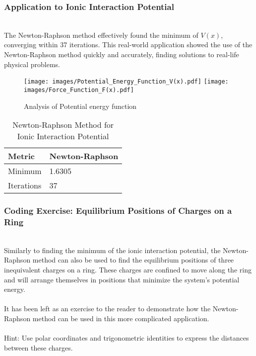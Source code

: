 \documentclass{llncs}
\numberwithin{figure}{section}
\begin{document}
\subsubsection{Application to Ionic Interaction Potential}\(\)
\\\\The Newton-Raphson method effectively found the minimum of $V(x)$, converging within 37 iterations. This real-world application showed the use of the Newton-Raphson method quickly and accurately, finding solutions to real-life physical problems.

\begin{figure}
    \centering
    \texttt{[image: images/Potential\_Energy\_Function\_V(x).pdf]}
    \quad  %
    \texttt{[image: images/Force\_Function\_F(x).pdf]}
    \caption{Analysis of Potential energy function}
    \label{fig:composite}
\end{figure}
\vspace{-3em}
\begin{table}
\centering
\caption{Newton-Raphson Method for Ionic Interaction Potential}
\label{table:4}
\vspace{1em}
\begin{tabularx}{\textwidth}{|X|X|}
\hline
Metric & Newton-Raphson \\
\hline
Minimum  & 1.6305 \\
\hline
Iterations & 37 \\
\hline
\end{tabularx}
\end{table}
\vspace{1em}
\subsubsection{Coding Exercise: Equilibrium Positions of Charges on a Ring}\(\)
\\\\
Similarly to finding the minimum of the ionic interaction potential, the Newton-Raphson method can also be used to find the equilibrium positions of three inequivalent charges on a ring. These charges are confined to move along the ring and will arrange themselves in positions that minimize the system's potential energy. 
\\\\It has been left as an exercise to the reader to demonstrate how the Newton-Raphson method can be used in this more complicated application.
\\\\ Hint: Use polar coordinates and trigonometric identities to express the distances between these charges.
\end{document}
